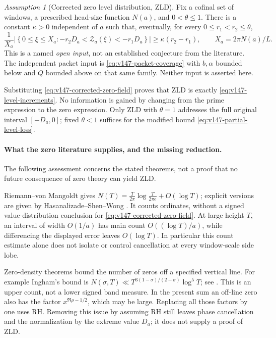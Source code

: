 \documentclass[11pt]{article}
\theoremstyle{remark}
\newtheorem{assumption}[theorem]{Assumption}
\begin{document}
\begin{assumption}[Corrected zero level distribution, ZLD]
\label{ass:v147-zld}
Fix a cofinal set of windows, a prescribed head-size function $N(a)$,
and $0<\theta\le1$. There is a constant $\kappa>0$ independent of
$a$ such that, eventually, for every $0\le r_1<r_2\le\theta$,
\begin{equation}\label{eq:v147-zld}
 \frac1{X_a}\left|\left\{0\le\xi\le X_a:
  -r_2D_a<\mathcal Z_a(\xi)<-r_1D_a\right\}\right|
 \ge\kappa(r_2-r_1),\qquad X_a=2\pi N(a)/L.
\end{equation}
This is a named \emph{open input}, not an established conjecture from
the literature. The independent packet input is
\eqref{eq:v147-packet-coverage} with $b,\alpha$ bounded below and
$Q$ bounded above on that same family. Neither input is asserted here.
\end{assumption}
Substituting \eqref{eq:v147-corrected-zero-field} proves that ZLD is
exactly \eqref{eq:v147-level-increments}. No information is gained by
changing from the prime expression to the zero expression. Only ZLD
with $\theta=1$ addresses the full original interval $[-D_a,0]$;
fixed $\theta<1$ suffices for the modified bound
\eqref{eq:v147-partial-level-loss}.

\paragraph{What the zero literature supplies, and the missing reduction.}
The following assessment concerns the stated theorems, not a proof
that no future consequence of zero theory can yield ZLD.

Riemann--von Mangoldt gives
$N(T)=\frac{T}{2\pi}\log\frac{T}{2\pi e}+O(\log T)$; explicit
versions are given by Hasanalizade--Shen--Wong
\cite{HasanalizadeShenWong2022}. It counts ordinates, without a signed
value-distribution conclusion for \eqref{eq:v147-corrected-zero-field}.
At large height $T$, an interval of width $O(1/a)$ has main count
$O((\log T)/a)$, while differencing the displayed error leaves
$O(\log T)$. In particular this count estimate alone does not isolate
or control cancellation at every window-scale side lobe.

Zero-density theorems bound the number of zeros off a specified
vertical line. For example Ingham's bound is
$N(\sigma,T)\ll T^{3(1-\sigma)/(2-\sigma)}\log^5T$; see
\cite{Ingham1940,ChourasiyaSimonic2025}. This is an upper count,
not a lower signed band measure. In the present sum an off-line zero
also has the factor $x^{\Re\rho-1/2}$, which may be large. Replacing
all those factors by one uses RH. Removing this issue by assuming RH
still leaves phase cancellation and the normalization by the extreme
value $D_a$; it does not supply a proof of ZLD.
\end{document}
